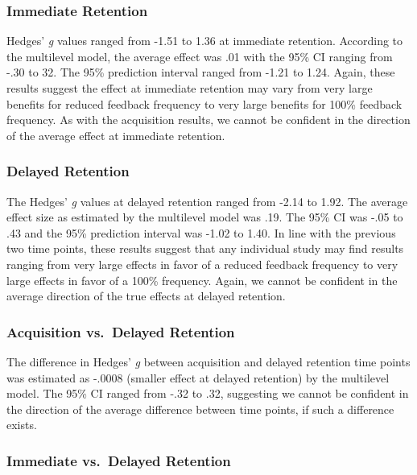 \documentclass[
  english,
  man, donotrepeattitle,mask,floatsintext]{apa7}
\begin{document}
\hypertarget{immediate-retention}{%
\subsubsection{Immediate Retention}\label{immediate-retention}}

Hedges' \emph{g} values ranged from -1.51 to 1.36 at immediate retention. According to the multilevel model, the average effect was .01 with the 95\% CI ranging from -.30 to 32. The 95\% prediction interval ranged from -1.21 to 1.24. Again, these results suggest the effect at immediate retention may vary from very large benefits for reduced feedback frequency to very large benefits for 100\% feedback frequency. As with the acquisition results, we cannot be confident in the direction of the average effect at immediate retention.

\hypertarget{delayed-retention}{%
\subsubsection{Delayed Retention}\label{delayed-retention}}

The Hedges' \emph{g} values at delayed retention ranged from -2.14 to 1.92. The average effect size as estimated by the multilevel model was .19. The 95\% CI was -.05 to .43 and the 95\% prediction interval was -1.02 to 1.40. In line with the previous two time points, these results suggest that any individual study may find results ranging from very large effects in favor of a reduced feedback frequency to very large effects in favor of a 100\% frequency. Again, we cannot be confident in the average direction of the true effects at delayed retention.

\hypertarget{acquisition-vs.-delayed-retention}{%
\subsubsection{Acquisition vs.~Delayed Retention}\label{acquisition-vs.-delayed-retention}}

The difference in Hedges' \emph{g} between acquisition and delayed retention time points was estimated as -.0008 (smaller effect at delayed retention) by the multilevel model. The 95\% CI ranged from -.32 to .32, suggesting we cannot be confident in the direction of the average difference between time points, if such a difference exists.

\hypertarget{immediate-vs.-delayed-retention}{%
\subsubsection{Immediate vs.~Delayed Retention}\label{immediate-vs.-delayed-retention}}
\end{document}
